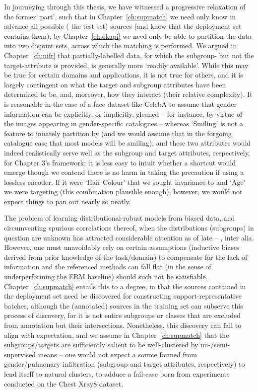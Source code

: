 %
In journeying through this thesis, we have witnessed a progressive relaxation of the former `part',
such that in Chapter~\ref{ch:supmatch} we need only know in advance all possible (\wrt{} the test
set) sources (and know that the deployment set contains them); by Chapter~\ref{ch:okapi} we need
only be able to partition the data into two disjoint sets, across which the matching is performed.
%
We argued in Chapter~\ref{ch:nifr} that partially-labelled data, for which the subgroup- but not
the target-attribute is provided, is generally more `readily available'. 
%
While this may be true for certain domains and applications, it is not true for others, and it is
largely contingent on what the target and subgroup attributes have been determined to be, and,
moreover, how they interact (their relative complexity).
%
It is reasonable in the case of a face dataset like CelebA to assume that gender information can be
explicitly, or implicitly, gleaned -- for instance, by virtue of the images appearing in
gender-specific catalogues -- whereas `Smiling' is not a feature to innately partition by (and we
would assume that in the forgoing catalogue case that most models will be smiling), and these two
attributes would indeed realistically serve well as the subgroup and target attributes,
respectively, for Chapter 3's framework; it is less easy to intuit whether a shortcut would emerge
though we contend there is no harm in taking the precaution if using a lossless encoder.
%
If it were `Hair Colour' that we sought invariance to and `Age' we were targeting (this combination
plausible enough), however, we would not expect things to pan out nearly so neatly.

%
The problem of learning distributional-robust models from biased data, and circumventing spurious
correlations thereof, when the distributions (subgroups) in question are unknown has attracted
considerable attention as of late -- \cite{HasSriNamLia18, SohDunAngGuetal20,
creager2021environment, liu2021just, pezeshki2021gradient, taghanaki2022masktune, kim2022learning},
inter alia.
%
However, one must unavoidably rely on certain assumptions (inductive biases derived from prior
knowledge of the task/domain) to compensate for the lack of information and the referenced methods
can fall flat (in the sense of underperforming the ERM baseline) should such not be satisfiable.
%
Chapter~\ref{ch:supmatch} entails this to a degree, in that the sources contained in the deployment
set need be discovered for constructing support-representative batches, although the (annotated)
sources in the training set can subserve this process of discovery, for it is not entire subgroups
or classes that are excluded from annotation but their intersections.
%
Nonetheless, this discovery can fail to align with expectation, and we assume in
Chapter~\ref{ch:supmatch} that the subgroups/targets are sufficiently salient to be well-clustered
by un-/semi-supervised means -- one would not expect a source formed from gender/pulmonary
infiltration (subgroup and target attributes, respectively) to lend itself to natural clusters, to
adduce a fail-case born from experiments conducted on the Chest Xray8 dataset. 

